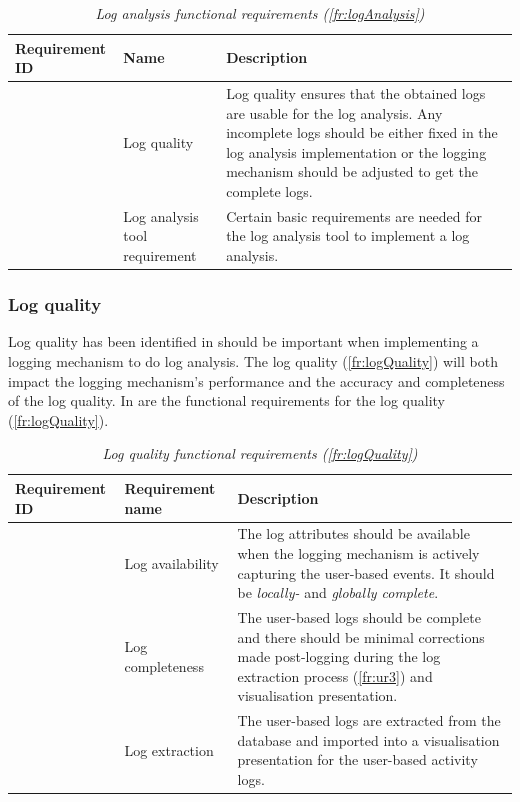 \setcounter{phase}{3}
\setcounter{subphase}{0}
\begin{table}[!htb]
	\centering
	\caption[Log analysis functional requirements (\ref{fr:logAnalysis})]
	{\textit{Log analysis functional requirements (\ref{fr:logAnalysis})}}
	\label{tbl:ch2_logAnalysis}
	\begin{tabularx}{\textwidth}{|l|l|X|}
		\hline \textbf{Requirement ID} & \textbf{Name} & \textbf{Description} \\
		\hline \subphase{fr:logQuality} & Log quality & \RaggedRight Log quality ensures that the obtained logs are usable for the log analysis. Any incomplete logs should be either fixed in the log analysis implementation or the logging mechanism should be adjusted to get the complete logs. \\
		\hline \subphase{fr:logAnalysisTool} & Log analysis tool requirement & \RaggedRight Certain basic requirements are needed for the log analysis tool to implement a log analysis. \\
		\hline
	\end{tabularx}
\end{table}

\subsubsection{Log quality}
Log quality has been identified in  should be important when implementing a logging mechanism to do log analysis. The log quality (\ref{fr:logQuality}) will both impact the logging mechanism's performance and the accuracy and completeness of the log quality.  In  are the functional requirements for the log quality (\ref{fr:logQuality}).

\setcounter{phase}{3}
\setcounter{subphase}{1}
\begin{table}[!htb]
	\centering
	\small
	\caption[Log quality functional requirements (\ref{fr:logQuality})]
	{\textit{Log quality functional requirements (\ref{fr:logQuality})}}
	\label{tbl:ch2_utilisation_requirements}
	\begin{tabularx}{\textwidth}{|l|l|X|}
		\hline \textbf{Requirement ID} & \textbf{Requirement name} & \textbf{Description} \\
		\hline \subsubphase{fr:ur1} & Log availability & \RaggedRight The log attributes should be available when the logging mechanism is actively capturing the user-based events. It should be \textit{locally-} and \textit{globally complete}.  \\
		\hline \subsubphase{fr:ur2} & Log completeness & \RaggedRight The user-based logs should be complete and there should be minimal corrections made post-logging during the log extraction process (\ref{fr:ur3}) and visualisation presentation. \\
		\hline \subsubphase{fr:ur3} & Log extraction & \RaggedRight The user-based logs are extracted from the database and imported into a visualisation presentation for the user-based activity logs. \\
		\hline
	\end{tabularx}
\end{table}

